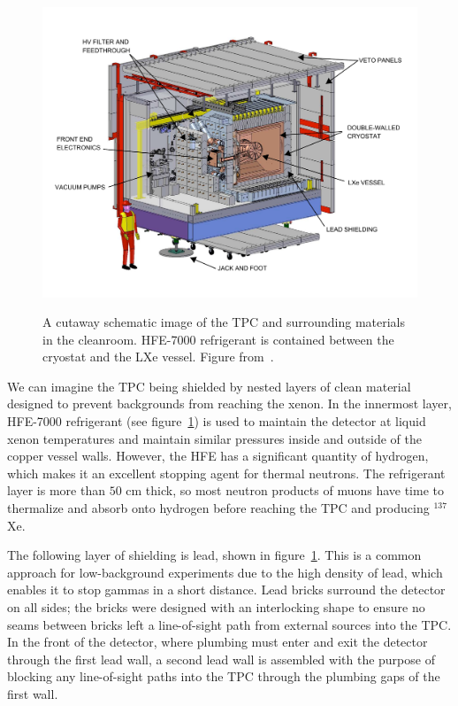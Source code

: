 \begin{figure}
\begin{center}
\includegraphics[keepaspectratio=true,width=\textwidth]{cleanroom.pdf}
\end{center}
\renewcommand{\baselinestretch}{1}
\small\normalsize
\begin{quote}
\caption{A cutaway schematic image of the TPC and surrounding materials in the cleanroom.  HFE-7000 refrigerant is contained between the cryostat and the LXe vessel.  Figure from~\cite{detectorPartI}.}
\label{fig:CleanRoomCutaway}
\end{quote}
\end{figure}
\renewcommand{\baselinestretch}{2}
\small\normalsize

We can imagine the TPC being shielded by nested layers of clean material designed to prevent backgrounds from reaching the xenon.  In the innermost layer, HFE-7000 refrigerant (see figure~\ref{fig:CleanRoomCutaway}) is used to maintain the detector at liquid xenon temperatures and maintain similar pressures inside and outside of the copper vessel walls.  However, the HFE has a significant quantity of hydrogen, which makes it an excellent stopping agent for thermal neutrons.  The refrigerant layer is more than $50$ cm thick, so most neutron products of muons have time to thermalize and absorb onto hydrogen before reaching the TPC and producing $^{137}$Xe.~\cite{detectorPartI}

The following layer of shielding is lead, shown in figure~\ref{fig:CleanRoomCutaway}.  This is a common approach for low-background experiments due to the high density of lead, which enables it to stop gammas in a short distance.  Lead bricks surround the detector on all sides; the bricks were designed with an interlocking shape to ensure no seams between bricks left a line-of-sight path from external sources into the TPC.  In the front of the detector, where plumbing must enter and exit the detector through the first lead wall, a second lead wall is assembled with the purpose of blocking any line-of-sight paths into the TPC through the plumbing gaps of the first wall.~\cite{detectorPartI}

